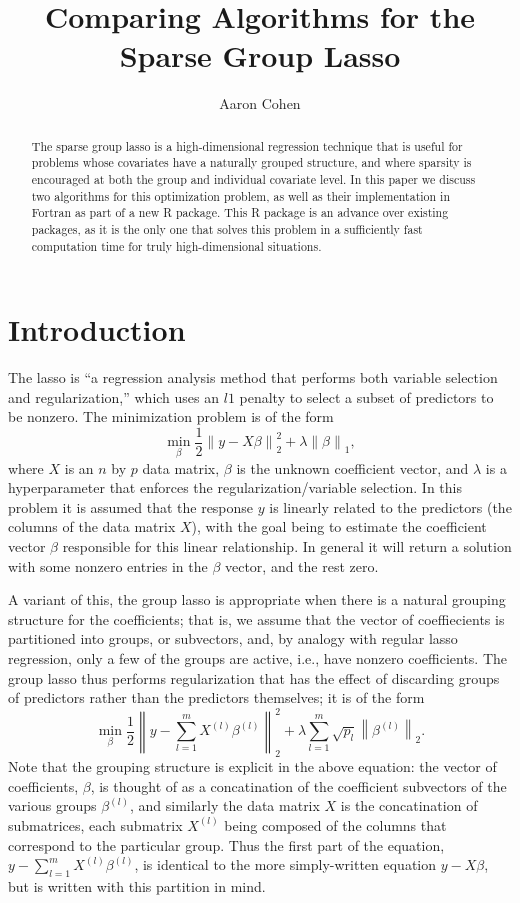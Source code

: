 \documentclass[12pt]{article}
\title{Comparing Algorithms for the Sparse Group Lasso}
\author{Aaron Cohen}
\newcommand{\norm}[1]{\left\lVert #1 \right\rVert}
\begin{document}
    \maketitle
    \begin{abstract}
        The sparse group lasso is a high-dimensional regression technique that is useful for problems whose covariates have a naturally grouped structure, and where sparsity is encouraged at both the group and individual covariate level. In this paper we discuss two algorithms for this optimization problem, as well as their implementation in Fortran as part of a new R package. This R package is an advance over existing packages, as it is the only one that solves this problem in a sufficiently fast computation time for truly high-dimensional situations.
    \end{abstract}

\section{Introduction}
\label{Sec:intro}
The lasso is ``a regression analysis method that performs both variable selection and regularization,'' which uses an $l1$ penalty \citep{tibshirani1996regression} to select a subset of predictors to be nonzero. The minimization problem is of the form
\[
\min_{\beta} \frac{1}{2}\norm{y-X\beta}_2^2 + \lambda \norm{\beta}_1,
\]
where $X$ is an $n$ by $p$ data matrix, $\beta$ is the unknown coefficient vector, and $\lambda$ is a hyperparameter that enforces the regularization/variable selection. In this problem it is assumed that the response $y$ is linearly related to the predictors (the columns of the data matrix $X$), with the goal being to estimate the coefficient vector $\beta$ responsible for this linear relationship. In general it will return a solution with some nonzero entries in the $\beta$ vector, and the rest zero.

A variant of this, the group lasso \citep{yuan2006model} is appropriate when there is a natural grouping structure for the coefficients; that is, we assume that the vector of coeffiecients is partitioned into groups, or subvectors, and, by analogy with regular lasso regression, only a few of the groups are active, i.e., have nonzero coefficients. The group lasso thus performs regularization that has the effect of discarding groups of predictors rather than the predictors themselves; it is of the form 
\[
\min_{\beta}\frac{1}{2}\norm{y-\sum_{l=1}^mX^{(l)}\beta^{(l)}}_2^2 + \lambda\sum_{l=1}^m\sqrt{p_l}\norm{\beta^{(l)}}_2.
\]
Note that the grouping structure is explicit in the above equation: the vector of coefficients, $\beta$, is thought of as a concatination of the coefficient subvectors of the various groups $\beta^{(l)}$, and similarly the data matrix $X$ is the concatination of submatrices, each submatrix $X^{(l)}$ being composed of the columns that correspond to the particular group. Thus the first part of the equation, $y-\sum_{l=1}^mX^{(l)}\beta^{(l)}$, is identical to the more simply-written equation $y-X\beta$, but is written with this partition in mind. 
\end{document}

